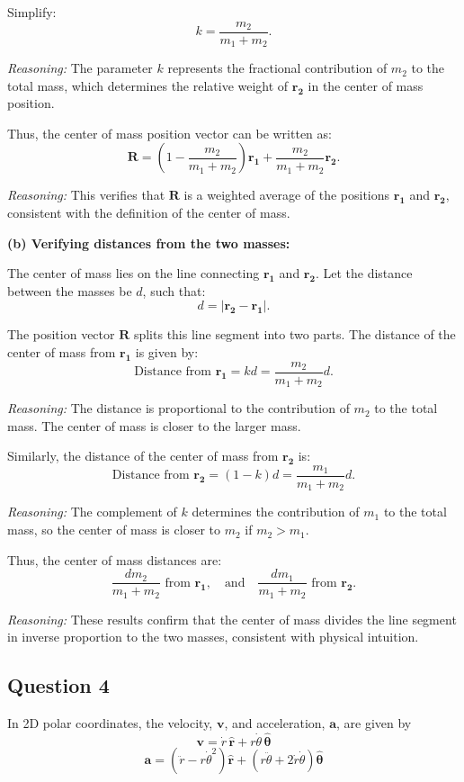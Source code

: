 \documentclass{article}
\begin{document}
Simplify:
\[
k = \frac{m_2}{m_1 + m_2}.
\]

\textit{Reasoning:} The parameter $k$ represents the fractional contribution of $m_2$ to the total mass, which determines the relative weight of $\mathbf{r_2}$ in the center of mass position.

Thus, the center of mass position vector can be written as:
\[
\mathbf{R} = (1 - \frac{m_2}{m_1 + m_2})\mathbf{r_1} + \frac{m_2}{m_1 + m_2}\mathbf{r_2}.
\]

\textit{Reasoning:} This verifies that $\mathbf{R}$ is a weighted average of the positions $\mathbf{r_1}$ and $\mathbf{r_2}$, consistent with the definition of the center of mass.

\bigskip

\textbf{(b) Verifying distances from the two masses:}

The center of mass lies on the line connecting $\mathbf{r_1}$ and $\mathbf{r_2}$. Let the distance between the masses be $d$, such that:
\[
d = |\mathbf{r_2} - \mathbf{r_1}|.
\]

The position vector $\mathbf{R}$ splits this line segment into two parts. The distance of the center of mass from $\mathbf{r_1}$ is given by:
\[
\text{Distance from } \mathbf{r_1} = k d = \frac{m_2}{m_1 + m_2} d.
\]

\textit{Reasoning:} The distance is proportional to the contribution of $m_2$ to the total mass. The center of mass is closer to the larger mass.

Similarly, the distance of the center of mass from $\mathbf{r_2}$ is:
\[
\text{Distance from } \mathbf{r_2} = (1 - k) d = \frac{m_1}{m_1 + m_2} d.
\]

\textit{Reasoning:} The complement of $k$ determines the contribution of $m_1$ to the total mass, so the center of mass is closer to $m_2$ if $m_2 > m_1$.

Thus, the center of mass distances are:
\[
\frac{dm_2}{m_1 + m_2} \text{ from } \mathbf{r_1}, \quad \text{and} \quad \frac{dm_1}{m_1 + m_2} \text{ from } \mathbf{r_2}.
\]

\textit{Reasoning:} These results confirm that the center of mass divides the line segment in inverse proportion to the two masses, consistent with physical intuition.

\subsection{Question 4}

In 2D polar coordinates, the velocity, \( \mathbf{v} \), and acceleration, \( \mathbf{a} \), are given by
\[
\mathbf{v} = \dot{r} \, \hat{\mathbf{r}} + r \dot{\theta} \, \hat{\boldsymbol{\theta}}
\]
\[
\mathbf{a} = \left( \ddot{r} - r \dot{\theta}^2 \right) \hat{\mathbf{r}} + \left( r \ddot{\theta} + 2 \dot{r} \dot{\theta} \right) \hat{\boldsymbol{\theta}}
\]
\end{document}
